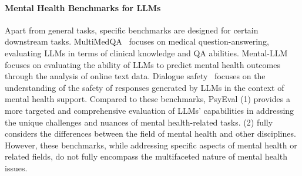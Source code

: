 \paragraph*{Mental Health Benchmarks for LLMs}
Apart from general tasks, specific benchmarks are designed for certain downstream tasks. MultiMedQA~\citep{singhal2023large} focuses on medical question-answering, evaluating LLMs in terms of clinical knowledge and QA abilities. Mental-LLM~\citep{xu2023leveraging} focuses on evaluating the ability of LLMs to predict mental health outcomes through the analysis of online text data. Dialogue safety~\citep{qiu2023benchmark} focuses on the understanding of the safety of responses generated by LLMs in the context of mental health support. Compared to these benchmarks, PsyEval (1) provides a more targeted and comprehensive evaluation of LLMs' capabilities in addressing the unique challenges and nuances of mental health-related tasks. (2) fully considers the differences between the field of mental health and other disciplines.
However, these benchmarks, while addressing specific aspects of mental health or related fields, do not fully encompass the multifaceted nature of mental health issues.


